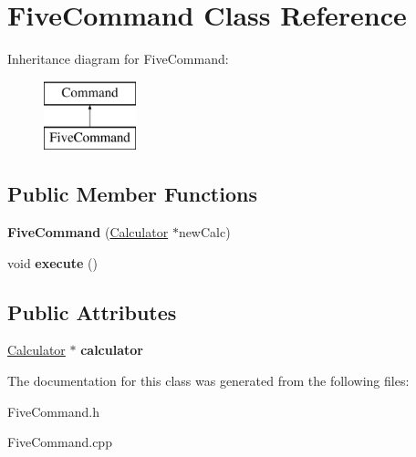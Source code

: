 \hypertarget{class_five_command}{}\section{Five\+Command Class Reference}
\label{class_five_command}
Inheritance diagram for Five\+Command\+:\begin{figure}[H]
\begin{center}
\leavevmode
\includegraphics[height=2.000000cm]{class_five_command}
\end{center}
\end{figure}
\subsection*{Public Member Functions}
\begin{DoxyCompactItemize}
\item 
\hypertarget{class_five_command_a7c39ae9c28cfcc1419acc180215ba3ba}{}{\bfseries Five\+Command} (\hyperlink{class_calculator}{Calculator} $\ast$new\+Calc)\label{class_five_command_a7c39ae9c28cfcc1419acc180215ba3ba}

\item 
\hypertarget{class_five_command_a97cbe6f79a00cf03fc8af1dc527dc801}{}void {\bfseries execute} ()\label{class_five_command_a97cbe6f79a00cf03fc8af1dc527dc801}

\end{DoxyCompactItemize}
\subsection*{Public Attributes}
\begin{DoxyCompactItemize}
\item 
\hypertarget{class_five_command_a9c6694f2dff27fabf44a4bacdbb07d12}{}\hyperlink{class_calculator}{Calculator} $\ast$ {\bfseries calculator}\label{class_five_command_a9c6694f2dff27fabf44a4bacdbb07d12}

\end{DoxyCompactItemize}


The documentation for this class was generated from the following files\+:\begin{DoxyCompactItemize}
\item 
Five\+Command.\+h\item 
Five\+Command.\+cpp\end{DoxyCompactItemize}
